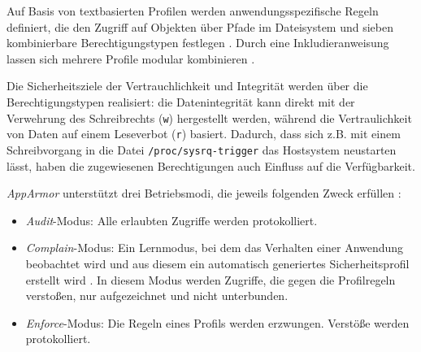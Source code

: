 \documentclass[../main.tex]{subfiles}
\begin{document}
				Auf Basis von textbasierten Profilen werden anwendungsspezifische Regeln definiert, die den Zugriff auf Objekten über Pfade im Dateisystem und sieben kombinierbare Berechtigungstypen festlegen \cite{linuxSecOverview}\cite{apparmorQuickProfileLanguage}. Durch eine Inkludieranweisung lassen sich mehrere Profile modular kombinieren \cite{apparmorQuickProfileLanguage}.

				Die Sicherheitsziele der Vertrauchlichkeit und Integrität werden über die Berechtigungstypen realisiert: die Datenintegrität kann direkt mit der Verwehrung des Schreibrechts (\texttt{w}) hergestellt werden, während die Vertraulichkeit von Daten auf einem Leseverbot (\texttt{r}) basiert. Dadurch, dass sich z.B. mit einem Schreibvorgang in die Datei \texttt{/proc/sysrq-trigger} das Hostsystem neustarten lässt, haben die zugewiesenen Berechtigungen auch Einfluss auf die Verfügbarkeit.


				\emph{AppArmor} unterstützt drei Betriebsmodi, die jeweils folgenden Zweck erfüllen \cite[S.82]{SELinuxApparmor}:
				\begin{itemize}
					\item \emph{Audit}-Modus: Alle erlaubten Zugriffe werden protokolliert.
					\item \emph{Complain}-Modus: Ein Lernmodus, bei dem das Verhalten einer Anwendung beobachtet wird und aus diesem ein automatisch generiertes Sicherheitsprofil erstellt wird \cite{linuxSecOverview}. In diesem Modus werden Zugriffe, die gegen die Profilregeln verstoßen, nur aufgezeichnet und nicht unterbunden.
					\item \emph{Enforce}-Modus: Die Regeln eines Profils werden erzwungen. Verstöße werden protokolliert.
				\end{itemize}

\end{document}
